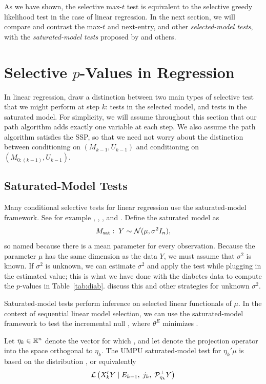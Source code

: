 \documentclass{article}
\begin{document}
As we have shown, the selective max-$t$ test is equivalent to the selective greedy likelihood test in the case of linear regression. In the next section, we will compare and contrast the max-$t$ and next-entry, and other {\em selected-model tests}, with the {\em saturated-model tests} proposed by \citet{tibshirani2014exact} and others. 

\section{Selective $p$-Values in Regression}
\label{sec:selective-reg}
In linear regression, \citet{fithian2014optimal} draw a distinction between two main types of selective test that we might perform at step $k$: tests in the selected model, and tests in the saturated model. For simplicity, we will assume throughout this section that our path algorithm adds exactly one variable at each step. We also assume the path algorithm satisfies the SSP, so that we need not worry about the distinction between conditioning on $(M_{k-1}, U_{k-1})$ and conditioning on $(M_{0:(k-1)}, U_{k-1})$.

\subsection{Saturated-Model Tests}
Many conditional selective tests for linear regression use the saturated-model framework. See for example \citet{taylor2013tests}, \citet{tibshirani2014exact}, \citet{lee2013exact}, and \citet{loftus2014significance}. Define the saturated model as
\[
M_{\text{sat}}:\; Y \sim \mathcal{N}(\mu, \sigma^2I_n),
\]
so named because there is a mean parameter for every observation. Because the parameter $\mu$ has the same dimension as the data $Y$, we must assume that $\sigma^2$ is known. If $\sigma^2$ is unknown, we can estimate $\sigma^2$ and apply the test while plugging in the estimated value; this is what we have done with the diabetes data to compute the $p$-values in Table~\ref{tab:diab}.  \citet{tibshirani2015uniform} discuss this and other strategies for unknown $\sigma^2$.

Saturated-model tests perform inference on selected linear functionals of $\mu$. In the context of sequential linear model selection,  we can use the saturated-model framework to test the incremental null , where $\theta^E$ minimizes .

Let $\eta_k\in \mathbb{R}^n$ denote the vector for which , and let  denote the projection operator into the space orthogonal to $\eta_k$. The UMPU saturated-model test for $\eta_k'\mu$ is based on the distribution , or equivalently
\begin{equation}\label{eq:satModel}
\mathcal{L}\left( X_k'Y \mid E_{k-1}, \;j_k, \;\mathcal{P}_{\eta_k}^\perp Y \right)
\end{equation}
\end{document}
